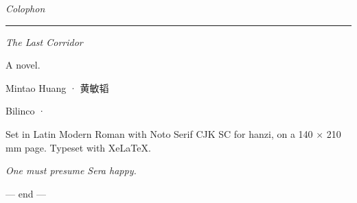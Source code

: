 \thispagestyle{empty}
\vspace*{\fill}
\begin{center}
{\large\itshape Colophon}\par
\vspace{1.4em}
{\color{rule}\rule{6em}{0.5pt}}\par
\vspace{1.6em}

\begin{minipage}{0.78\textwidth}\centering\small
\textit{The Last Corridor}\par
A novel.\par
\vspace{1em}
Mintao Huang \enspace · \enspace 黄敏韬\par
Bilinco \enspace · \par
\vspace{1.4em}

Set in Latin Modern Roman with Noto Serif CJK SC for hanzi, on a 140 × 210 mm page. Typeset with Xe\LaTeX{}.\par
\vspace{2em}

{\itshape One must presume Sera happy.}\par
\vspace{2em}

{\footnotesize\color{dim}— end —}\par
\end{minipage}
\end{center}
\vspace*{\fill}

